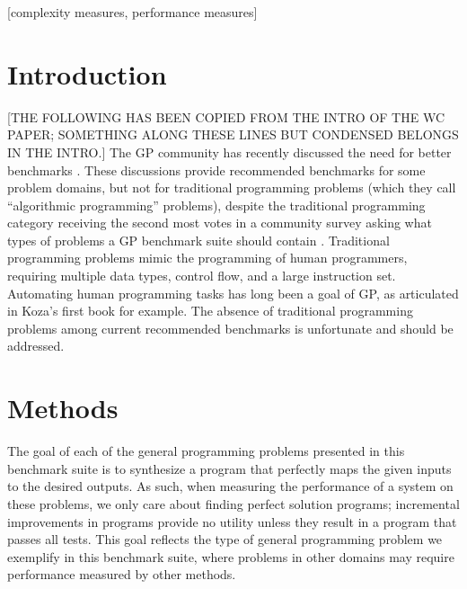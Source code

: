 \documentclass{sig-alternate}
\begin{document}
[complexity measures, performance measures]



\section{Introduction}



[THE FOLLOWING HAS BEEN COPIED FROM THE INTRO OF THE WC PAPER; SOMETHING ALONG THESE LINES BUT CONDENSED BELONGS IN THE INTRO.]
The GP community has recently discussed the need for better benchmarks \cite{McDermott:2012:GECCO, White:2013:BGB:2441218.2441242}. These discussions provide recommended benchmarks for some problem domains, but not for traditional programming problems (which they call ``algorithmic programming'' problems), despite the traditional programming category receiving the second most votes in a community survey asking what types of problems a GP benchmark suite should contain \cite{White:2013:BGB:2441218.2441242}. Traditional programming problems mimic the programming of human programmers, requiring multiple data types, control flow, and a large instruction set. Automating human programming tasks has long been a goal of GP, as articulated in Koza's first book \cite{koza:book} for example. The absence of traditional programming problems among current recommended benchmarks is unfortunate and should be addressed.



\section{Methods}

The goal of each of the general programming problems presented in this benchmark suite is to synthesize a program that perfectly maps the given inputs to the desired outputs. As such, when measuring the performance of a system on these problems, we only care about finding perfect solution programs; incremental improvements in programs provide no utility unless they result in a program that passes all tests. This goal reflects the type of general programming problem we exemplify in this benchmark suite, where problems in other domains may require performance measured by other methods. 
\end{document}
